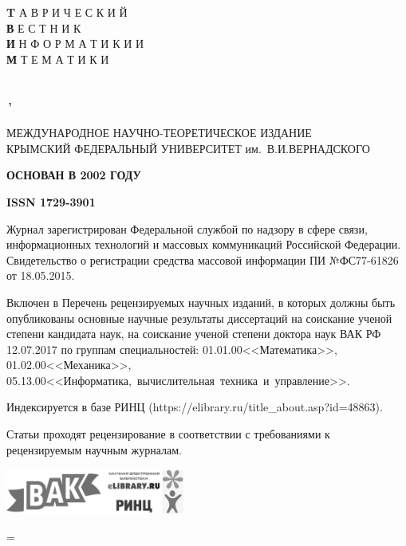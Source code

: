 \thispagestyle{empty}

\parindent=0mm
\myinter=2pt

{\Huge\sf \textbf{T} }{\Large\sf А В Р И Ч Е С К И Й}\\%

{\Huge\sf \textbf{В} }{\Large\sf Е С Т Н И К}\\%

{\Huge\sf \textbf{И} }{\Large\sf Н Ф О Р М А Т И К И \; И}\\%

{\Huge\sf \textbf{М} }{\Large{} Т Е М А Т И К И}\\%
\\\\
{\Large\textbf{\textsf{\tvimnumber\,'\;\tvimyear}}}
\vspace{1cm}

{\footnotesize\sf\def\baselinestretch{1}
МЕЖДУНАРОДНОЕ НАУЧНО-ТЕОРЕТИЧЕСКОЕ ИЗДАНИЕ\\
КРЫМСКИЙ ФЕДЕРАЛЬНЫЙ УНИВЕРСИТЕТ им.~В.\;И.\;ВЕРНАДСКОГО}

\vspace{0.7cm}%
{\footnotesize\sf \textbf{ОСНОВАН В 2002 ГОДУ}}

\vspace{0.5cm}%
{\footnotesize\sf \textbf{ISSN 1729-3901}}

\vspace{0.5cm}%

{\footnotesize\sf Журнал зарегистрирован Федеральной службой по надзору в сфере
связи, информационных \mbox{технологий} и массовых коммуникаций Российской
Федерации. Свидетельство о регистрации средства массовой информации ПИ
№ФС77-61826 от 18.05.2015.}

\vspace{0.5cm}
{\footnotesize\sf Включен в Перечень рецензируемых научных изданий, в которых
должны быть опубликованы \mbox{основные} научные результаты диссертаций на
соискание \mbox{ученой} степени кандидата наук, на соискание \mbox{ученой}
степени доктора наук ВАК РФ 12.07.2017 по группам специальностей:
\mbox{01.01.00\;<<Математика>>}, \mbox{01.02.00\;<<Механика>>},
\mbox{05.13.00\;<<Информатика, вычислительная техника и управление>>.}}

\vspace{0.4cm}

{\footnotesize\sf 
Индексируется в базе РИНЦ (https://elibrary.ru/title\_about.asp?id=48863).}

\vspace{0.3cm}
{\footnotesize\sf
Статьи проходят рецензирование в соответствии с требованиями к рецензируемым
научным журналам.}

\enlargethispage{\baselineskip}
\vfill

\includegraphics[height=1.5cm]{logo/vak_rinc_gray}

\parindent=\myparindent
